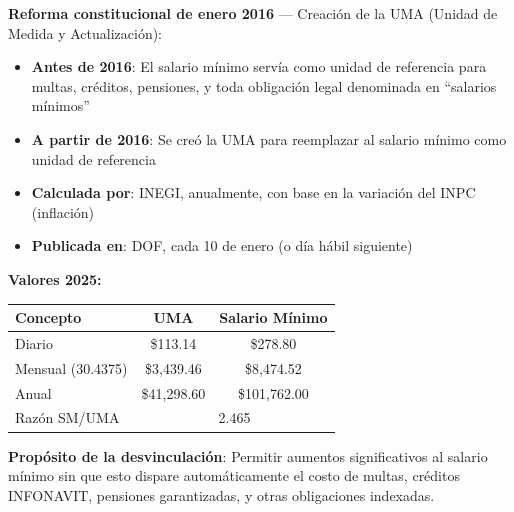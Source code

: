 \documentclass[11pt,a4paper]{report}
\begin{document}
\begin{tcolorbox}[colback=blue!5!white, colframe=blue!75!black, title=\textbf{Definici\'on Formal}]
\textbf{Reforma constitucional de enero 2016} --- Creaci\'on de la UMA (Unidad de Medida y Actualizaci\'on):

\begin{itemize}[nosep]
\item \textbf{Antes de 2016}: El salario m\'inimo serv\'ia como unidad de referencia para multas, cr\'editos, pensiones, y toda obligaci\'on legal denominada en ``salarios m\'inimos''
\item \textbf{A partir de 2016}: Se cre\'o la UMA para reemplazar al salario m\'inimo como unidad de referencia
\item \textbf{Calculada por}: INEGI, anualmente, con base en la variaci\'on del INPC (inflaci\'on)
\item \textbf{Publicada en}: DOF, cada 10 de enero (o d\'ia h\'abil siguiente)
\end{itemize}

\textbf{Valores 2025:}
\begin{center}
\begin{tabular}{lcc}
\toprule
\textbf{Concepto} & \textbf{UMA} & \textbf{Salario M\'inimo} \\
\midrule
Diario & \$113.14 & \$278.80 \\
Mensual (30.4375) & \$3,439.46 & \$8,474.52 \\
Anual & \$41,298.60 & \$101,762.00 \\
\midrule
Raz\'on SM/UMA & \multicolumn{2}{c}{2.465} \\
\bottomrule
\end{tabular}
\end{center}

\textbf{Prop\'osito de la desvinculaci\'on}: Permitir aumentos significativos al salario m\'inimo sin que esto dispare autom\'aticamente el costo de multas, cr\'editos INFONAVIT, pensiones garantizadas, y otras obligaciones indexadas.
\end{tcolorbox}
\end{document}
